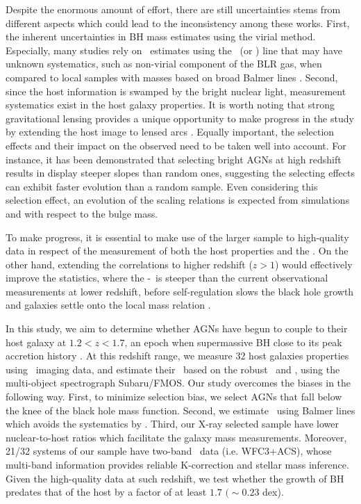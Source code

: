 \documentclass[apj]{emulateapj}
\begin{document}
Despite the enormous amount of effort, there are still uncertainties stems from different aspects which could lead to the inconsistency among these works. First, the inherent uncertainties in BH mass estimates using the virial method. Especially, many studies rely on \mbh\ estimates using the \Civ\ (or \Mgii) line that may have unknown systematics, such as non-virial component of the BLR gas, when compared to local samples with masses based on broad Balmer lines \citep[i.e. \halpha\ and \hbeta,][]{Schulze2018, Baskin2005, Trakhtenbrot2012}. Second, since the host information is swamped by the bright nuclear light, measurement systematics exist in the host galaxy properties. It is worth noting that strong gravitational lensing provides a unique opportunity to make progress in the study by extending the host image to lensed arcs \citep{Pen++06qsob, Ding2017a, Ding2017b}. Equally important, the selection effects and their impact on the observed need to be taken well into account. For instance, it has been demonstrated \citep{Schulze2011, Schulze2014} that selecting bright AGNs at high redshift results in display steeper slopes than random ones, suggesting the selecting effects can exhibit faster evolution than a random sample. Even considering this selection effect, an evolution of the scaling relations is expected from simulations \citep{DeG++15} and with respect to the bulge mass.

To make progress, it is essential to make use of the larger sample to high-quality data in respect of the measurement of both the host properties and the \mbh. On the other hand, extending the correlations to higher redshift ($z>1$) would effectively improve the statistics, where the \mbh-\lhost\ is steeper than the current observational measurements at lower redshift, before self-regulation slows the black hole growth and galaxies settle onto the local mass relation \citep{DeG++15}.

In this study, we aim to determine whether AGNs have begun to couple to their host galaxy at $1.2<z<1.7$, an epoch when supermassive BH close to its peak accretion history \citep{Aird2015}.  At this redshift range, we measure 32 host galaxies properties using \hst\ imaging data, and estimate their \mbh\ based on the robust \halpha\ and \hbeta, using the multi-object spectrograph Subaru/FMOS. Our study overcomes the biases in the following way. First, to minimize selection bias, we select AGNs that fall below the knee of the black hole mass function. Second, we estimate \mbh\ using Balmer lines which avoids the systematics by \Mgii. Third, our X-ray selected sample have lower nuclear-to-host ratios which facilitate the galaxy mass measurements. Moreover, 21/32 systems of our sample have two-band \hst\ data (i.e. WFC3+ACS), whose multi-band information provides reliable K-correction and stellar mass inference. Given the high-quality data at such redshift, we test whether the growth of BH predates that of the host by a factor of at least $1.7$ $(\sim0.23$ dex). 
\end{document}
